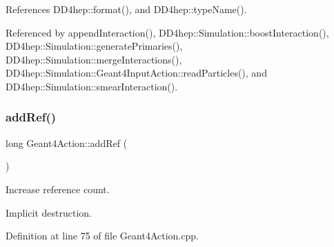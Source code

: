 References D\+D4hep\+::format(), and D\+D4hep\+::type\+Name().



Referenced by append\+Interaction(), D\+D4hep\+::\+Simulation\+::boost\+Interaction(), D\+D4hep\+::\+Simulation\+::generate\+Primaries(), D\+D4hep\+::\+Simulation\+::merge\+Interactions(), D\+D4hep\+::\+Simulation\+::\+Geant4\+Input\+Action\+::read\+Particles(), and D\+D4hep\+::\+Simulation\+::smear\+Interaction().

\hypertarget{class_d_d4hep_1_1_simulation_1_1_geant4_action_abf90df73db256488940810101fd63a8a}{}\label{class_d_d4hep_1_1_simulation_1_1_geant4_action_abf90df73db256488940810101fd63a8a} 
\subsubsection{\texorpdfstring{add\+Ref()}{addRef()}}
{\footnotesize\ttfamily long Geant4\+Action\+::add\+Ref (\begin{DoxyParamCaption}{ }\end{DoxyParamCaption})}



Increase reference count. 

Implicit destruction. 

Definition at line 75 of file Geant4\+Action.\+cpp.



